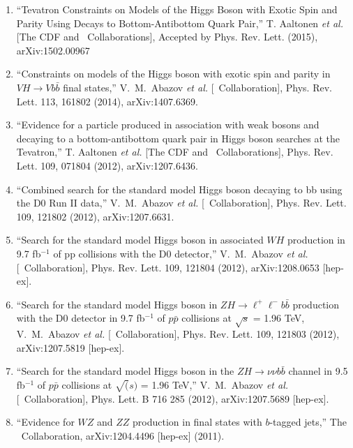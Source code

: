 \begin{enumerate}
\item ``Tevatron Constraints 
on Models of the Higgs Boson with Exotic Spin and Parity Using Decays 
to Bottom-Antibottom Quark Pair,'' T. Aaltonen {\it et al.} 
[The CDF and \dzero\ Collaborations], 
Accepted by Phys. Rev. Lett. (2015),
arXiv:1502.00967


\item ``Constraints on models of the Higgs boson with exotic spin and parity in $VH\to Vb\bar{b}$ final states,''
V.~M.~Abazov {\it et al.}  [\dzero\ Collaboration],
Phys. Rev. Lett. 113, 161802 (2014),
arXiv:1407.6369.

\item ``Evidence for a particle produced in association with weak bosons and decaying to a 
        bottom-antibottom quark pair in Higgs boson searches at the Tevatron,''
T. Aaltonen {\it et al.} [The CDF and \dzero\ Collaborations],
Phys. Rev. Lett. 109, 071804 (2012),
arXiv:1207.6436.

\item ``Combined search for the standard model Higgs boson decaying to bb using the D0 Run II data,''
V.~M.~Abazov {\it et al.}  [\dzero\ Collaboration],
Phys. Rev. Lett. 109, 121802 (2012),
arXiv:1207.6631.

\item ``Search for the standard model Higgs boson in associated $WH$ production in 9.7 fb$^{-1}$
          of pp collisions with the D0 detector,''
V.~M.~Abazov {\it et al.}  [\dzero\ Collaboration],
Phys. Rev. Lett. 109, 121804 (2012),
arXiv:1208.0653 [hep-ex].

\item ``Search for the standard model Higgs boson in $ZH\to\ell^+\ell^- b{\bar b}$ production with the D0
          detector in 9.7 fb$^{-1}$ of $p{\bar p}$ collisions at $\sqrt{s}$ = 1.96 TeV,
V.~M.~Abazov {\it et al.}  [\dzero\ Collaboration],
Phys. Rev. Lett. 109, 121803 (2012),
arXiv:1207.5819 [hep-ex].

\item ``Search for the standard model Higgs boson in the $ZH\to\nu\nu b{\bar b}$ channel in 9.5 fb$^{-1}$ of $p{\bar p}$ collisions at $\sqrt(s)$ = 1.96 TeV,'' 
V.~M.~Abazov {\it et al.}  [\dzero\ Collaboration],
Phys. Lett. B 716 285 (2012),
 arXiv:1207.5689 [hep-ex].

\item ``Evidence for $WZ$ and $ZZ$ production in final states with $b$-tagged jets,''
The \dzero\ Collaboration,
arXiv:1204.4496 [hep-ex] (2011).


\end{enumerate}
